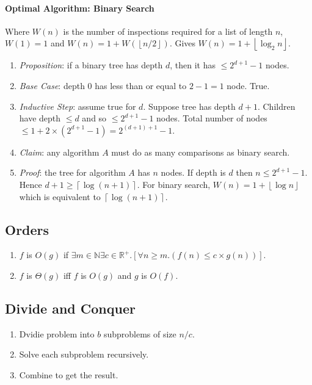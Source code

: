 \documentclass[twocolumn,english]{article}
\begin{document}
\paragraph{Optimal Algorithm: Binary Search}

Where $W\left(n\right)$ is the number of inspections required for
a list of length $n$, $W\left(1\right)=1$ and $W\left(n\right)=1+W\left(\left\lfloor n/2\right\rfloor \right)$.
Gives $W(n)=1+\left\lfloor \log_{2}n\right\rfloor $.
\begin{enumerate}
\item \emph{Proposition}: if a binary tree has depth $d$, then it has $\leq2^{d+1}-1$
nodes.
\item \emph{Base Case}: depth 0 has less than or equal to $2-1=1$ node.
True.
\item \emph{Inductive Step}: assume true for $d$. Suppose tree has depth
$d+1$. Children have depth $\leq d$ and so $\leq2^{d+1}-1$ nodes.
Total number of nodes $\leq1+2\times\left(2^{d+1}-1\right)=2^{(d+1)+1}-1$.
\item \emph{Claim}: any algorithm $A$ must do as many comparisons as binary
search.
\item \emph{Proof}: the tree for algorithm $A$ has $n$ nodes. If depth
is $d$ then $n\leq2^{d+1}-1$. Hence $d+1\geq\left\lceil \log\left(n+1\right)\right\rceil $.
For binary search, $W(n)=1+\left\lfloor \log n\right\rfloor $ which
is equivalent to $\left\lceil \log\left(n+1\right)\right\rceil $.
\end{enumerate}

\subsection{Orders}
\begin{enumerate}
\item $f$ is $O\left(g\right)$ if $\exists m\in\mathbb{N}\exists c\in\mathbb{R}^{+}.\left[\forall n\geq m.\left(f\left(n\right)\leq c\times g\left(n\right)\right)\right]$.
\item $f$ is $\Theta\left(g\right)$ iff $f$ is $O\left(g\right)$ and
$g$ is $O\left(f\right)$.
\end{enumerate}

\subsection{Divide and Conquer}
\begin{enumerate}
\item Dvidie problem into $b$ subproblems of size $n/c$.
\item Solve each subproblem recursively.
\item Combine to get the result.
\end{enumerate}
\end{document}
